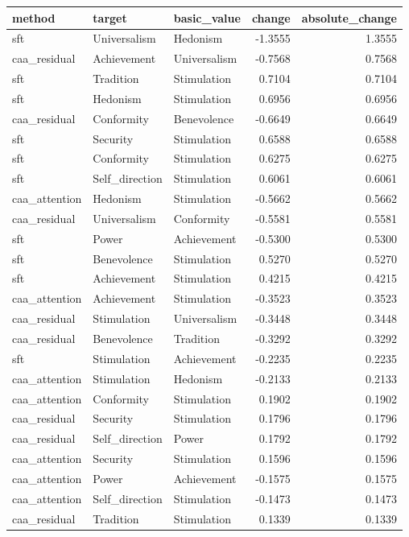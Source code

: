 \begin{tabular}{lllrr}
\toprule
method & target & basic\_value & change & absolute\_change \\
\midrule
sft & Universalism & Hedonism & -1.3555 & 1.3555 \\
caa\_residual & Achievement & Universalism & -0.7568 & 0.7568 \\
sft & Tradition & Stimulation & 0.7104 & 0.7104 \\
sft & Hedonism & Stimulation & 0.6956 & 0.6956 \\
caa\_residual & Conformity & Benevolence & -0.6649 & 0.6649 \\
sft & Security & Stimulation & 0.6588 & 0.6588 \\
sft & Conformity & Stimulation & 0.6275 & 0.6275 \\
sft & Self\_direction & Stimulation & 0.6061 & 0.6061 \\
caa\_attention & Hedonism & Stimulation & -0.5662 & 0.5662 \\
caa\_residual & Universalism & Conformity & -0.5581 & 0.5581 \\
sft & Power & Achievement & -0.5300 & 0.5300 \\
sft & Benevolence & Stimulation & 0.5270 & 0.5270 \\
sft & Achievement & Stimulation & 0.4215 & 0.4215 \\
caa\_attention & Achievement & Stimulation & -0.3523 & 0.3523 \\
caa\_residual & Stimulation & Universalism & -0.3448 & 0.3448 \\
caa\_residual & Benevolence & Tradition & -0.3292 & 0.3292 \\
sft & Stimulation & Achievement & -0.2235 & 0.2235 \\
caa\_attention & Stimulation & Hedonism & -0.2133 & 0.2133 \\
caa\_attention & Conformity & Stimulation & 0.1902 & 0.1902 \\
caa\_residual & Security & Stimulation & 0.1796 & 0.1796 \\
caa\_residual & Self\_direction & Power & 0.1792 & 0.1792 \\
caa\_attention & Security & Stimulation & 0.1596 & 0.1596 \\
caa\_attention & Power & Achievement & -0.1575 & 0.1575 \\
caa\_attention & Self\_direction & Stimulation & -0.1473 & 0.1473 \\
caa\_residual & Tradition & Stimulation & 0.1339 & 0.1339 \\

\end{tabular}

